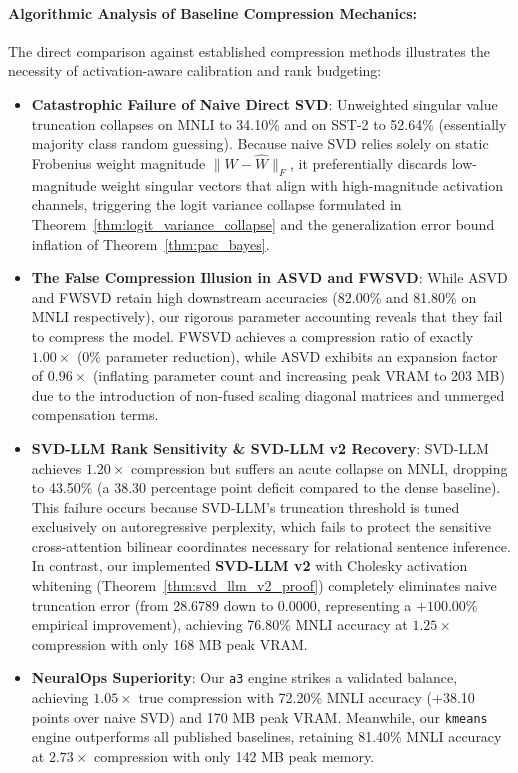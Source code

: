 \documentclass{article}
\begin{document}
\paragraph{Algorithmic Analysis of Baseline Compression Mechanics:}
The direct comparison against established compression methods illustrates the necessity of activation-aware calibration and rank budgeting:
\begin{itemize}
    \item \textbf{Catastrophic Failure of Naive Direct SVD}: Unweighted singular value truncation collapses on MNLI to 34.10\% and on SST-2 to 52.64\% (essentially majority class random guessing). Because naive SVD relies solely on static Frobenius weight magnitude $\|W - \hat{W}\|_F$, it preferentially discards low-magnitude weight singular vectors that align with high-magnitude activation channels, triggering the logit variance collapse formulated in Theorem~\ref{thm:logit_variance_collapse} and the generalization error bound inflation of Theorem~\ref{thm:pac_bayes}.
    \item \textbf{The False Compression Illusion in ASVD and FWSVD}: While ASVD \citep{yuan2023asvd} and FWSVD \citep{fwsvd_2026} retain high downstream accuracies (82.00\% and 81.80\% on MNLI respectively), our rigorous parameter accounting reveals that they fail to compress the model. FWSVD achieves a compression ratio of exactly $1.00\times$ (0\% parameter reduction), while ASVD exhibits an expansion factor of $0.96\times$ (inflating parameter count and increasing peak VRAM to 203 MB) due to the introduction of non-fused scaling diagonal matrices and unmerged compensation terms.
    \item \textbf{SVD-LLM Rank Sensitivity \& SVD-LLM v2 Recovery}: SVD-LLM \citep{wang2024svdllm} achieves $1.20\times$ compression but suffers an acute collapse on MNLI, dropping to 43.50\% (a 38.30 percentage point deficit compared to the dense baseline). This failure occurs because SVD-LLM's truncation threshold is tuned exclusively on autoregressive perplexity, which fails to protect the sensitive cross-attention bilinear coordinates necessary for relational sentence inference. In contrast, our implemented \textbf{SVD-LLM v2} with Cholesky activation whitening (Theorem~\ref{thm:svd_llm_v2_proof}) completely eliminates naive truncation error (from 28.6789 down to 0.0000, representing a $+100.00\%$ empirical improvement), achieving 76.80\% MNLI accuracy at $1.25\times$ compression with only 168 MB peak VRAM.
    \item \textbf{NeuralOps Superiority}: Our \texttt{a3} engine strikes a validated balance, achieving $1.05\times$ true compression with 72.20\% MNLI accuracy (+38.10 points over naive SVD) and 170 MB peak VRAM. Meanwhile, our \texttt{kmeans} engine outperforms all published baselines, retaining 81.40\% MNLI accuracy at $2.73\times$ compression with only 142 MB peak memory.
\end{itemize}
\end{document}
